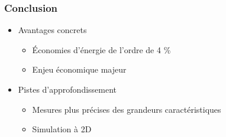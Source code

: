 \documentclass[a4paper,11pt]{beamer}
\begin{document}
\begin{frame}
    \frametitle{Conclusion}

    \begin{itemize}
        \item Avantages concrets
        \begin{itemize}
            \item Économies d'énergie de l'ordre de 4 \%
            \item Enjeu économique majeur
        \end{itemize}
        \item Pistes d'approfondissement
        \begin{itemize}
            \item Mesures plus précises des grandeurs caractéristiques
            \item Simulation à 2D
        \end{itemize}
    \end{itemize}
\end{frame}
\end{document}
